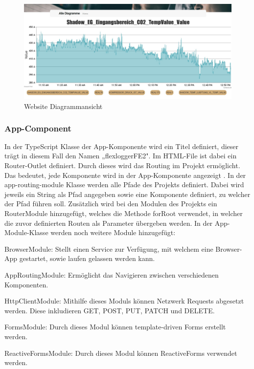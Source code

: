 \begin{figure}
    \centering
    \includegraphics[scale=0.35]{pics/FlexLoggerWebsiteDiagramm.jpg}
    \caption{Website Diagrammansicht}
    \label{fig:impl:FlexLoggerDiagrammAnsicht}
\end{figure}
 
\subsubsection{App-Component}
In der TypeScript Klasse der App-Komponente wird ein Titel definiert, dieser trägt in diesem Fall den Namen „flexloggerFE2". Im HTML-File ist dabei ein Router-Outlet definiert. Durch dieses wird das Routing im Projekt ermöglicht. Das bedeutet, jede Komponente wird in der App-Komponente angezeigt %
. In der app-routing-module Klasse werden alle Pfade des Projekts definiert. Dabei wird jeweils ein String als Pfad angegeben sowie eine Komponente definiert, zu welcher der Pfad führen soll. Zusätzlich wird bei den Modulen des Projekts ein RouterModule hinzugefügt, welches die Methode forRoot verwendet, in welcher die zuvor definierten Routen als Parameter übergeben werden. In der App-Module-Klasse werden noch weitere Module hinzugefügt:
 
\begin{compactitem}
    \item BrowserModule: Stellt einen Service zur Verfügung, mit welchem eine Browser-App gestartet, sowie laufen gelassen werden kann.
    \item AppRoutingModule: Ermöglicht das Navigieren zwischen verschiedenen Komponenten.
    \item HttpClientModule: Mithilfe dieses Moduls können Netzwerk Requests abgesetzt werden. Diese inkludieren GET, POST, PUT, PATCH und DELETE.   
    \item FormsModule: Durch dieses Modul können template-driven Forms erstellt werden.
    \item ReactiveFormsModule: Durch dieses Modul können ReactiveForms verwendet werden.
\end{compactitem}
 
